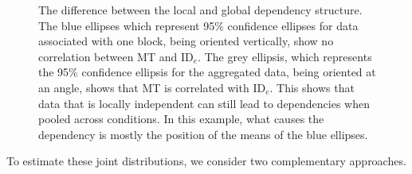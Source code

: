 \documentclass[acmlarge, manuscript,review]{acmart}
\newcommand{\ide}{\ensuremath{{\text{ID}_e}}\xspace}
\begin{document}
\begin{figure}[htbp]
\begin{tikzpicture}[scale=1.2]
  \end{tikzpicture}

  \caption{The difference between the local and global dependency structure. The blue ellipses which represent 95\% confidence ellipses for data associated with one block, being oriented vertically, show no correlation between MT and \ide. The grey ellipsis, which represents the 95\% confidence ellipsis for the aggregated data, being oriented at an angle, shows that MT is correlated with \ide. This shows that data that is locally independent can still lead to dependencies when pooled across conditions. In this example, what causes the dependency is mostly the position of the means of the blue ellipses.}
  \label{fig:global_local_dep}
\end{figure}


To estimate these joint distributions, we consider two complementary approaches.
\end{document}
